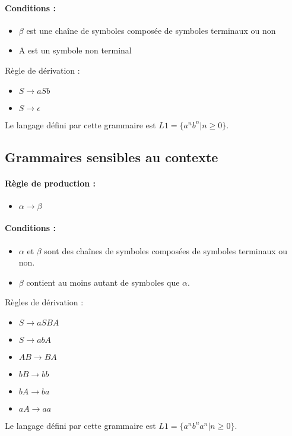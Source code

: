 \paragraph{Conditions :}

\begin{itemize}
	\item  $\beta$ est une chaîne de symboles composée de symboles terminaux
	       	ou non
	\item A est un symbole non terminal
\end{itemize}

\begin{myexem} Règle de dérivation :
	\begin{itemize}
		\item $S \rightarrow aSb$
		\item $S \rightarrow \epsilon$
	\end{itemize}
	Le langage défini par cette grammaire est $L1 = \{a^nb^n|n\geq 0\}$.
\end{myexem}

\subsection{Grammaires sensibles au contexte}
\paragraph{Règle de production :}
\begin{itemize}
	\item $\alpha \rightarrow \beta$
\end{itemize}

\paragraph{Conditions :}
\begin{itemize}
	\item $\alpha$ et $\beta$ sont des chaînes de symboles composées de
		symboles terminaux ou non.
	\item $\beta$ contient au moins
		autant de symboles que $\alpha$.
\end{itemize}

\begin{myexem} Règles de dérivation :
	\begin{itemize}
		\item $S \rightarrow aSBA$
		\item $S \rightarrow abA$
		\item $AB \rightarrow BA$
		\item $bB \rightarrow bb$
		\item $bA \rightarrow ba$
		\item $aA \rightarrow aa$
	\end{itemize}
	Le langage défini par cette grammaire est $L1 =
	\{a^nb^na^n|n \geq 0\}$.
\end{myexem}

